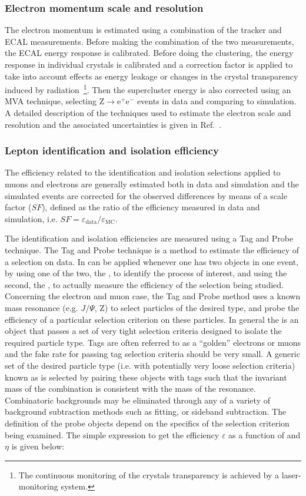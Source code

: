 \subsubsection{Electron momentum scale and resolution}
The electron momentum is estimated using a combination of the tracker and ECAL measurements. Before making the combination of the two measurements, the ECAL energy response is calibrated. Before doing the clustering, the energy response in individual crystals is calibrated and a correction factor is applied to take into account effects as energy leakage or changes in the crystal transparency induced by radiation~\footnote{The continuous monitoring of the crystals transparency is achieved by a laser-monitoring system.}. Then the supercluster energy is also corrected using an MVA technique, selecting Z$\to\mathrm{e^+ e^-}$ events in data and comparing to simulation. A detailed description of the techniques used to estimate the electron scale and resolution and the associated uncertainties is given in Ref.~\cite{Khachatryan:2015hwa}.

\subsubsection{Lepton identification and isolation efficiency}\label{sec:lepIdIsoEff}
The efficiency related to the identification and isolation selections applied to muons and electrons are generally estimated both in data and simulation and the simulated events are corrected for the observed differences by means of a scale factor ($SF$), defined as the ratio of the efficiency measured in data and simulation, i.e. $SF = \varepsilon_\mathrm{data}/\varepsilon_\mathrm{MC}$.

The identification and isolation efficiencies are measured using a Tag and Probe technique. 
The Tag and Probe technique is a method to estimate the efficiency of a selection on data. In can be applied whenever one has two objects in one event, by using one of the two, the \tg{}, to identify the process of interest, and using the second, the \probe{}, to actually measure the efficiency of the selection being studied.
Concerning the electron and muon case, the Tag and Probe method uses a known mass resonance (e.g. $J/\Psi$, Z) to select particles of the desired type, and probe the efficiency of a particular selection criterion on these particles. In general the \tg{} is an object that passes a set of very tight selection criteria designed to isolate the required particle type. Tags are often referred to as a ``golden'' electrons or muons and the fake rate for passing tag selection criteria should be very small. A generic set of the desired particle type (i.e. with potentially very loose selection criteria) known as \probe{} is selected by pairing these objects with tags such that the invariant mass of the combination is consistent with the mass of the resonance. Combinatoric backgrounds may be eliminated through any of a variety of background subtraction methods such as fitting, or sideband subtraction. The definition of the probe objects depend on the specifics of the selection criterion being examined. The simple expression to get the efficiency $\varepsilon$ as a function of \pt and $\eta$ is given below:

